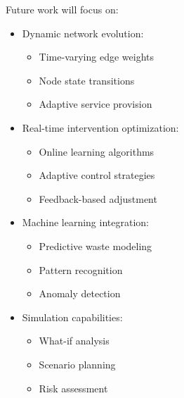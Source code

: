 \documentclass[12pt]{article}
\theoremstyle{definition}
\begin{document}
Future work will focus on:
\begin{itemize}
    \item Dynamic network evolution:
        \begin{itemize}
            \item Time-varying edge weights
            \item Node state transitions
            \item Adaptive service provision
        \end{itemize}
    \item Real-time intervention optimization:
        \begin{itemize}
            \item Online learning algorithms
            \item Adaptive control strategies
            \item Feedback-based adjustment
        \end{itemize}
    \item Machine learning integration:
        \begin{itemize}
            \item Predictive waste modeling
            \item Pattern recognition
            \item Anomaly detection
        \end{itemize}
    \item Simulation capabilities:
        \begin{itemize}
            \item What-if analysis
            \item Scenario planning
            \item Risk assessment
        \end{itemize}
\end{itemize}



\end{document}
